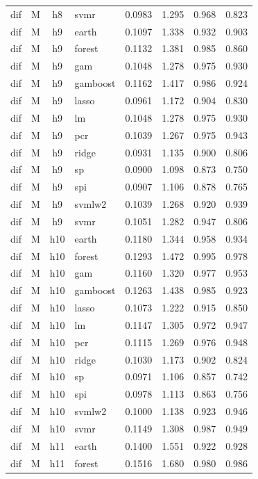 \begin{ThreePartTable}
\begin{longtable}[t]{llclcccc}
dif & M & h8 & svmr & 0.0983 & 1.295 & 0.968 & 0.823\\
\addlinespace
dif & M & h9 & earth & 0.1097 & 1.338 & 0.932 & 0.903\\
dif & M & h9 & forest & 0.1132 & 1.381 & 0.985 & 0.860\\
dif & M & h9 & gam & 0.1048 & 1.278 & 0.975 & 0.930\\
dif & M & h9 & gamboost & 0.1162 & 1.417 & 0.986 & 0.924\\
dif & M & h9 & lasso & 0.0961 & 1.172 & 0.904 & 0.830\\
dif & M & h9 & lm & 0.1048 & 1.278 & 0.975 & 0.930\\
dif & M & h9 & pcr & 0.1039 & 1.267 & 0.975 & 0.943\\
dif & M & h9 & ridge & 0.0931 & 1.135 & 0.900 & 0.806\\
dif & M & h9 & sp & 0.0900 & 1.098 & 0.873 & 0.750\\
dif & M & h9 & spi & 0.0907 & 1.106 & 0.878 & 0.765\\
dif & M & h9 & svmlw2 & 0.1039 & 1.268 & 0.920 & 0.939\\
dif & M & h9 & svmr & 0.1051 & 1.282 & 0.947 & 0.806\\
\addlinespace
dif & M & h10 & earth & 0.1180 & 1.344 & 0.958 & 0.934\\
dif & M & h10 & forest & 0.1293 & 1.472 & 0.995 & 0.978\\
dif & M & h10 & gam & 0.1160 & 1.320 & 0.977 & 0.953\\
dif & M & h10 & gamboost & 0.1263 & 1.438 & 0.985 & 0.923\\
dif & M & h10 & lasso & 0.1073 & 1.222 & 0.915 & 0.850\\
dif & M & h10 & lm & 0.1147 & 1.305 & 0.972 & 0.947\\
dif & M & h10 & pcr & 0.1115 & 1.269 & 0.976 & 0.948\\
dif & M & h10 & ridge & 0.1030 & 1.173 & 0.902 & 0.824\\
dif & M & h10 & sp & 0.0971 & 1.106 & 0.857 & 0.742\\
dif & M & h10 & spi & 0.0978 & 1.113 & 0.863 & 0.756\\
dif & M & h10 & svmlw2 & 0.1000 & 1.138 & 0.923 & 0.946\\
dif & M & h10 & svmr & 0.1149 & 1.308 & 0.987 & 0.949\\
\addlinespace
dif & M & h11 & earth & 0.1400 & 1.551 & 0.922 & 0.928\\
dif & M & h11 & forest & 0.1516 & 1.680 & 0.980 & 0.986\\

\end{longtable}
\end{ThreePartTable}
